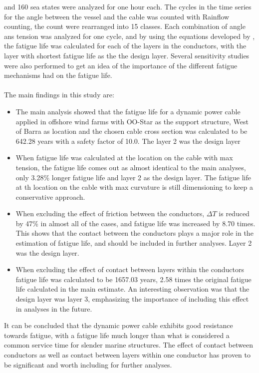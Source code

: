 and 160 sea states were analyzed for one hour each. The cycles in the time series for the angle between the vessel and the cable was counted with Rainflow counting, the count were rearranged into 15 classes. Each combination of angle ans tension was analyzed for one cycle, and by using the equations developed by \cite{s300}, the fatigue life was calculated for each of the layers in the conductors, with the layer with shortest fatigue life as the the design layer. Several sensitivity studies were also performed to get an idea of the importance of the different fatigue mechanisms had on the fatigue life.\\\\The main findings in this study are:
\begin{itemize}
    \item The main analysis showed that the fatigue life for a dynamic power cable applied in offshore wind farms with OO-Star as the support structure, West of Barra as location and the chosen cable cross section was calculated to be 642.28 years with a safety factor of 10.0. The layer 2 was the design layer
    \item When fatigue life was calculated at the location on the cable with max tension, the fatigue life comes out as almost identical to the main analyses, only 3.28\% longer fatigue life and layer 2 as the design layer. The fatigue life at th location on the cable with max curvature is still dimensioning to keep a conservative approach.
    \item When excluding the effect of friction between the conductors, $\Delta T$ is reduced by 47\% in almost all of the cases, and fatigue life was increased by 8.70 times. This shows that the contact between the conductors plays a major role in the estimation of fatigue life, and should be included in further analyses. Layer 2 was the design layer. 
    \item When excluding the effect of contact between layers within the conductors fatigue life was calculated to be 1657.03 years, 2.58 times the original fatigue life calculated in the main estimate. An interesting observation was that the design layer was layer 3, emphasizing the importance of including this effect in analyses in the future. 
\end{itemize}
It can be concluded that the dynamic power cable exhibits good resistance towards fatigue, with a fatigue life much longer than what is considered a common service time for slender marine structures. The effect of contact between conductors as well as contact between layers within one conductor has proven to be significant and worth including for further analyses. 

